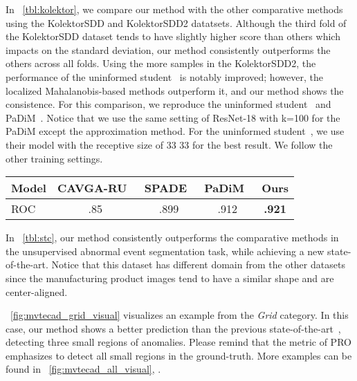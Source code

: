  In \tbl~\ref{tbl:kolektor}, we compare our method with the other comparative methods using the KolektorSDD and KolektorSDD2 datatsets. Although the third fold of the KolektorSDD dataset tends to have slightly higher score than others which impacts on the standard deviation, our method consistently outperforms the others across all folds. 
Using the more samples in the KolektorSDD2, the performance of the uninformed student~\cite{Bergmann2020} is notably improved; however, the localized Mahalanobis-based methods outperform it, and our method shows the consistence.
For this comparison, we reproduce the uninformed student~\cite{Bergmann2020} and PaDiM~\cite{Defard2020}. Notice that we use the same setting of ResNet-18 with k=100 for the PaDiM except the approximation method. For the uninformed student~\cite{Bergmann2020}, we use their model with the receptive size of 33  33 for the best result. We follow the other training settings.

\begin{table*}[t!]
  \centering
  \caption{The ROC results for the unsupervised anomaly segmentation task using the mSTC dataset. 
  Our method use ResNet-18 with k=100 for the fair comparison.
  } 
  \label{tbl:stc}
  \begin{tabular}{lcccc}
  \toprule
  Model     & CAVGA-RU~\cite{Venkataramanan2020} & SPADE~\cite{Cohen2020} & PaDiM~\cite{Defard2020} & Ours \\ \midrule
  ROC     & .85\0    & .899    & .912    & \bf{.921} \\
  \bottomrule
  \end{tabular}
\end{table*}
 
 In \tbl~\ref{tbl:stc}, our method consistently outperforms the comparative methods in the unsupervised abnormal event segmentation task, while achieving a new state-of-the-art. Notice that this dataset has different domain from the other datasets since the manufacturing product images tend to have a similar shape and are center-aligned.

 \fig~\ref{fig:mvtecad_grid_visual} visualizes an example from the \textit{Grid} category. In this case, our method shows a better prediction than the previous state-of-the-art~\cite{Defard2020}, detecting three small regions of anomalies. Please remind that the metric of PRO emphasizes to detect all small regions in the ground-truth. More examples can be found in \fig~\ref{fig:mvtecad_all_visual}, \appx.